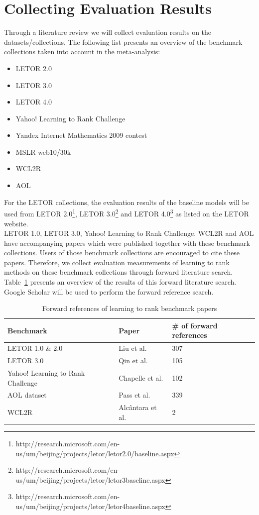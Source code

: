 \documentclass{sig-alternate-2013}
\begin{document}
\section{Collecting Evaluation Results}
\label{sec:collecting_evaluation_results}
Through a literature review we will collect evaluation results on the datasets/collections. The following list presents an overview of the benchmark collections taken into account in the meta-analysis:
\begin{itemize}\itemsep0em
\item LETOR 2.0
\item LETOR 3.0
\item LETOR 4.0
\item Yahoo! Learning to Rank Challenge
\item Yandex Internet Mathematics 2009 contest
\item MSLR-web10/30k
\item WCL2R
\item AOL
\end{itemize}

For the LETOR collections, the evaluation results of the baseline models will be used from LETOR 2.0\footnote{http://research.microsoft.com/en-us/um/beijing/projects/letor/letor2.0/baseline.aspx}, LETOR 3.0\footnote{http://research.microsoft.com/en-us/um/beijing/projects/letor/letor3baseline.aspx} and LETOR 4.0\footnote{http://research.microsoft.com/en-us/um/beijing/projects/letor/letor4baseline.aspx} as listed on the LETOR website.\\

LETOR 1.0, LETOR 3.0, Yahoo! Learning to Rank Challenge, WCL2R and AOL have accompanying papers which were published together with these benchmark collections. Users of those benchmark collections are encouraged to cite these papers. Therefore, we collect evaluation measurements of learning to rank methods on these benchmark collections through forward literature search. Table~\ref{tbl:ltr_benchmark_forref} presents an overview of the results of this forward literature search. Google Scholar will be used to perform the forward reference search.

\begin{table}[!h]
\begin{tabular}{p{2.8cm}lp{1.8cm}}\toprule
Benchmark & Paper & \# of forward references \\
\midrule
LETOR 1.0 \& 2.0 & Liu et al. \cite{Liu2007b} & 307\\
LETOR 3.0 & Qin et al. \cite{Qin2010} & 105\\
Yahoo! Learning to Rank Challenge & Chapelle et al. \cite{Chapelle2011a} & 102\\
AOL dataset & Pass et al. \cite{Pass2006} & 339\\
WCL2R & Alc{\^a}ntara et al. \cite{Alcantara2010} & 2\\
\bottomrule
\end{tabular}
\caption{Forward references of learning to rank benchmark papers}
\label{tbl:ltr_benchmark_forref}
\end{table}
\end{document}
